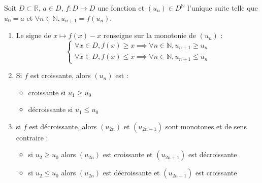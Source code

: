 \documentclass{article}
\begin{document}
\begin{adjustwidth}{-3cm}{-3cm}

    \pagecolor{saumon}
    \noindent Soit $D \subset \mathbb{R}$, $a \in D$, $f:D \rightarrow D$ une fonction et $(u_n) \in D^{\mathbb{N}}$ l'unique suite telle que $u_0 = a$ et $\forall n \in \mathbb{N}, u_{n+1} = f(u_n)$.
    \begin{enumerate}[label=\textbf{\arabic*.}]

        \item Le signe de $x \mapsto f(x) - x$ renseigne sur la monotonie de $(u_n)$ :\begin{equation*}\begin{cases}
            \forall x \in D, f(x) \geq x \implies \forall n \in \mathbb{N}, u_{n+1} \geq u_n \\
            \forall x \in D, f(x) \leq x \implies \forall n \in \mathbb{N}, u_{n+1} \leq u_n 
            \end{cases}\end{equation*}

        \item  Si $f$ est croissante, alors $(u_n)$ est :
        \begin{itemize}
            \item croissante si $u_1 \geq u_0$
            \item décroissante si $u_1 \leq u_0$
        \end{itemize}

        \item si $f$ est décroissante, alors $(u_{2n})$ et $(u_{2n+1})$ sont monotones et de sens contraire :
        \begin{itemize}
            \item si $u_2 \geq u_0$ alors $(u_{2n})$ est croissante et $(u_{2n+1})$ est décroissante
            \item si $u_2 \leq u_0$ alors $(u_{2n})$ est décroissante et $(u_{2n+1})$ est croissante
        \end{itemize}


        
        \end{enumerate}


\end{adjustwidth}
\end{document}

